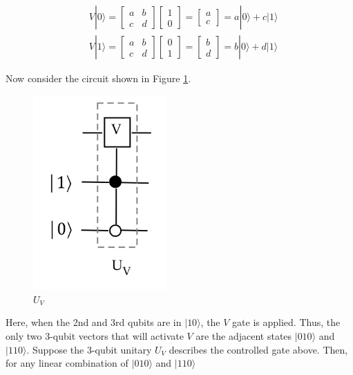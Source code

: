 \documentclass[main.tex]{subfiles}
\begin{document}
    $$
    \begin{aligned}
    &V|0\rangle=\left[\begin{array}{ll}
    a & b \\
    c & d
    \end{array}\right]\left[\begin{array}{l}
    1 \\
    0
    \end{array}\right]=\left[\begin{array}{l}
    a \\
    c
    \end{array}\right]=a|0\rangle+c|1\rangle \\
    &V|1\rangle=\left[\begin{array}{ll}
    a & b \\
    c & d
    \end{array}\right]\left[\begin{array}{l}
    0 \\
    1
    \end{array}\right]=\left[\begin{array}{l}
    b \\
    d
    \end{array}\right]=b|0\rangle+d|1\rangle
    \end{aligned}
    $$
    
    Now consider the circuit shown in Figure \ref{fig:18multicontrol3}.
    
    \begin{figure}
        \centering
        \includegraphics[width=2in]{notes/figs/n09/18multicontrol3.png}
        \caption{$U_V$}
        \label{fig:18multicontrol3}
    \end{figure}
    
    Here, when the 2nd and 3rd qubits are in $|10\rangle$, the $V$ gate is applied. Thus, the only two 3-qubit vectors that will activate $V$ are the adjacent states $|010\rangle$ and $|110\rangle$. Suppose the 3-qubit unitary $U_{V}$ describes the controlled gate above. Then, for any linear combination of $|010\rangle$ and $|110\rangle$
    
\end{document}
